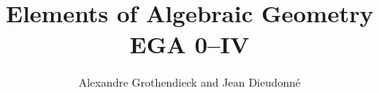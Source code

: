



\setlength{\emergencystretch}{3em}


\newcommand{\EGAResetVolumeCounters}{%
  \setcounter{section}{0}%
  \setcounter{subsection}{0}%
  \setcounter{equation}{0}%
  \setcounter{figure}{0}%
  \setcounter{table}{0}%
  \setcounter{footnote}{0}%
}

\newcommand{\EGAVolumeTitlePage}[3]{%
  \clearpage
  \EGAResetVolumeCounters
  \renewcommand*{\theHtable}{#1.\arabic{table}}%
  \phantomsection
  \label{section:#1}%
  \pdfbookmark[0]{#2: #3}{volume.#1}%
  \addcontentsline{toc}{part}{#2: #3}%
  \thispagestyle{empty}%
  \vspace*{\fill}%
  \begin{center}
    {\Huge\bfseries #2\par}
    \vspace{1.5em}
    {\LARGE #3\par}
    \vspace{2em}
    {\large Alexandre Grothendieck and Jean Dieudonn\'e\par}
    \vspace{1em}
    {\large English reader\par}
  \end{center}
  \vspace*{\fill}%
  \clearpage
}



\title{Elements of Algebraic Geometry\\EGA 0--IV}
\author{Alexandre Grothendieck and Jean Dieudonn\'e}
\date{}
\maketitle


